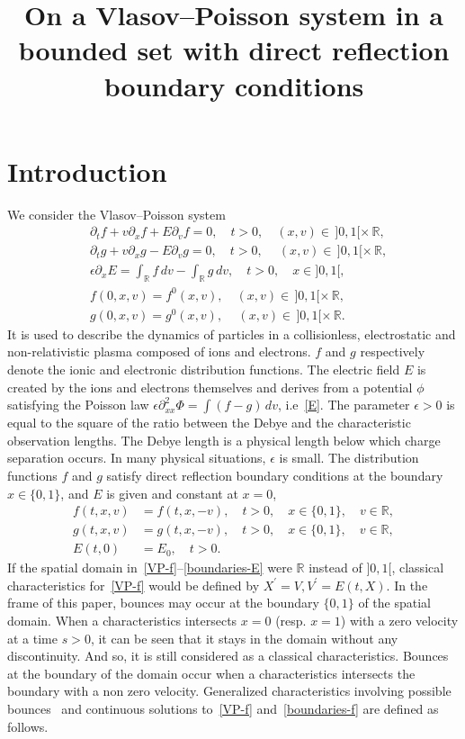 \documentclass[AHL,Unicode,longabstracts,published]{cedram}
\title[On a Vlasov--Poisson system in a bounded set with direct reflection boundary conditions]{On a Vlasov--Poisson system in a bounded set with direct reflection boundary conditions}
\author[\initial{P.-A.} \lastname{Giorgi}]{\firstname{Pierre-Antoine} \lastname{Giorgi}}
\author[\initial{A.} \lastname{Nouri}]{\firstname{Anne} \lastname{Nouri}}
\newcommand{\R}{\mathbb{R}}
\begin{document}
\maketitle

\section{Introduction}\label{introduction}

We consider the Vlasov--Poisson system
\begin{align}
&\partial_t f+ v \partial_x f+ E\partial_v f= 0, \quad t>0, \quad (x,v) \in\,]0,1[\times \,\R, \label{VP-f}
\\
&\partial_t g+ v \partial_x g- E\partial_v g= 0, \quad t>0, \quad\: (x,v)\in\,]0,1[\times \,\R, \label{VP-g}
\\
&\epsilon \partial_x E= \int_{\R } f\, dv - \int_{\R } g\, dv, \quad t>0,\quad x \in]0,1[, \label{E}
\\
&f(0,x,v)= f^0(x,v), \quad (x,v) \in \,]0,1[\times \,\R, \label{init-f}
\\
&g(0,x,v)= g^0(x,v), \quad\, (x,v) \in \,]0,1[\times \,\R. \label{init-g}
\end{align}
It is used to describe the dynamics of particles in a collisionless, electrostatic and non-relativistic plasma composed of ions and electrons. $f$ and $g$ respectively denote the ionic and electronic distribution functions. The electric field $E$ is created by the ions and electrons themselves and derives from a potential $\phi$ satisfying the Poisson law $\epsilon \partial _{xx}^2\Phi = \int (f-g)\, dv$, i.e~\eqref{E}. The parameter $\epsilon >0$ is equal to the square of the ratio between the Debye and the characteristic observation lengths. The Debye length is a physical length below which charge separation occurs. In many physical situations, $\epsilon $ is small. The distribution functions $f$ and $g$ satisfy direct reflection boundary conditions at the boundary $x \in \{0,1\}$, and $E$ is given and constant at $x=0$,
\begin{align}
f(t,x,v) &= f(t,x,-v),\quad t>0, \quad x\in \{0,1\},\quad v\in \R, \label{boundaries-f}
\\
g(t,x,v) &= g(t,x,-v),\quad t>0, \quad x\in \{0,1\},\quad v\in \R, \label{boundaries-g}
\\
E(t,0) &= E_0,\quad t>0.\label{boundaries-E}
\end{align}
If the spatial domain in~\eqref{VP-f}--\eqref{boundaries-E} were $\R $ instead of $]0,1[$, classical characteristics for~\eqref{VP-f} would be defined by $X^\prime = V, V^\prime = E(t,X)$. In the frame of this paper, bounces may occur at the boundary $\{0,1\}$ of the spatial domain. When a characteristics intersects $x=0$ (resp. $x=1$) with a zero velocity at a time $s>0$, it can be seen that it stays in the domain without any discontinuity. And so, it is still considered as a classical characteristics. Bounces at the boundary of the domain occur when a characteristics intersects the boundary with a non zero velocity. Generalized characteristics involving possible bounces~\cite{Guo95,HS08} and continuous solutions to~\eqref{VP-f} and~\eqref{boundaries-f} are defined as follows.
\end{document}
